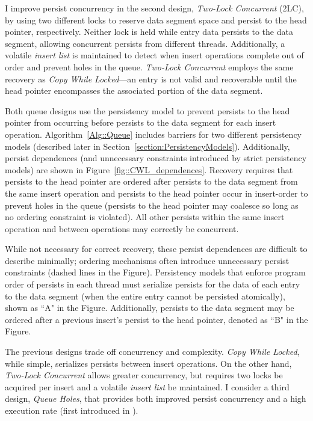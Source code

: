 I improve persist concurrency in the second design, \emph{Two-Lock Concurrent} (2LC), by using two different locks to reserve data segment space and persist to the head pointer, respectively.
Neither lock is held while entry data persists to the data segment, allowing concurrent persists from different threads.
Additionally, a volatile \emph{insert list} is maintained to detect when insert operations complete out of order and prevent holes in the queue.
\emph{Two-Lock Concurrent} employs the same recovery as \emph{Copy While Locked}---an entry is not valid and recoverable until the head pointer encompasses the associated portion of the data segment.



Both queue designs use the persistency model to prevent persists to the head pointer from occurring before persists to the data segment for each insert operation.
Algorithm~\ref{Alg::Queue} includes barriers for two different persistency models (described later in Section~\ref{section:PersistencyModels}).
Additionally, persist dependences (and unnecessary constraints introduced by strict persistency models) are shown in Figure~\ref{fig::CWL_dependences}.
Recovery requires that persists to the head pointer are ordered after persists to the data segment from the same insert operation and persists to the head pointer occur in insert-order to prevent holes in the queue (persists to the head pointer may coalesce so long as no ordering constraint is violated).
All other persists within the same insert operation and between operations may correctly be concurrent.

While not necessary for correct recovery, these persist dependences are difficult to describe minimally; ordering mechanisms often introduce unnecessary persist constraints (dashed lines in the Figure).
Persistency models that enforce program order of persists in each thread must serialize persists for the data of each entry to the data segment (when the entire entry cannot be persisted atomically), shown as ``A" in the Figure.
Additionally, persists to the data segment may be ordered after a previous insert's persist to the head pointer, denoted as ``B" in the Figure.

The previous designs trade off concurrency and complexity.
\emph{Copy While Locked}, while simple, serializes persists between insert operations.
On the other hand, \emph{Two-Lock Concurrent} allows greater concurrency, but requires two locks be acquired per insert and a volatile \emph{insert list} be maintained.
I consider a third design, \emph{Queue Holes}, that provides both improved persist concurrency and a high execution rate (first introduced in \cite{FangHsiao11}).

